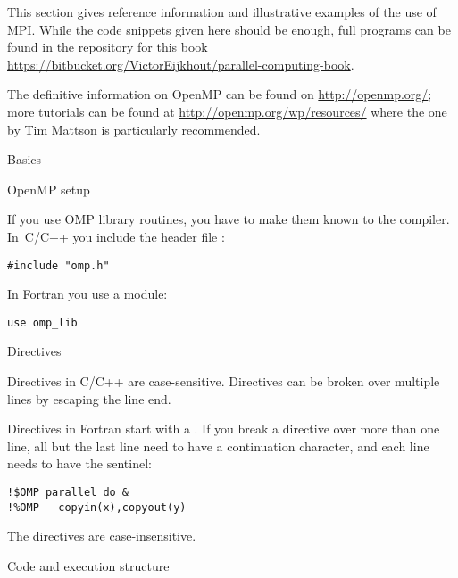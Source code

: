 
This section gives reference information and illustrative examples
of the use of MPI. While the code snippets given here should be enough,
full programs can be found in the repository for this book
\url{https://bitbucket.org/VictorEijkhout/parallel-computing-book}.

The definitive information on OpenMP can be found on
\url{http://openmp.org/}; more tutorials can be found at
\url{http://openmp.org/wp/resources/} where the one
by Tim Mattson is particularly recommended.

 {Basics}

 {OpenMP setup}

If you use OMP library routines, you have to make them known to
the compiler. In~C/C++ you include the header file :
\begin{verbatim}
#include "omp.h"
\end{verbatim}
In Fortran you use a module:
\begin{verbatim}
use omp_lib
\end{verbatim}

 {Directives}

Directives in C/C++ are case-sensitive. Directives can be broken over
multiple lines by escaping the line end.

Directives in Fortran start with a .
If you break a directive over more than one line, all but the last line
need to have a continuation character, and each line needs to have the sentinel:
\begin{verbatim}
!$OMP parallel do &
!%OMP   copyin(x),copyout(y)
\end{verbatim}
The directives are case-insensitive.


 {Code and execution structure}

